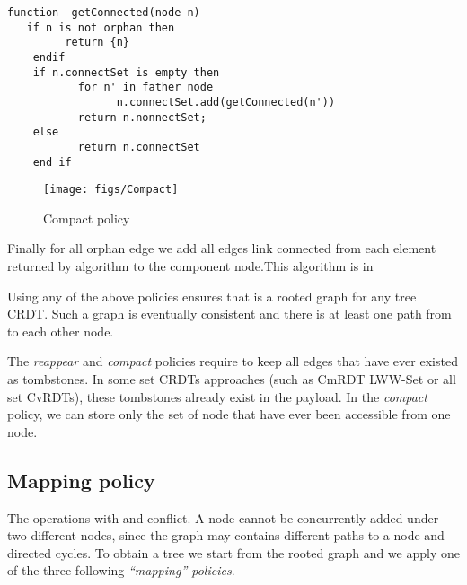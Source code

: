 \documentclass[a4paper]{article}
\begin{document}
\begin{description}
 \begin{lstlisting}
function  getConnected(node n)
   if n is not orphan then
         return {n}
    endif
    if n.connectSet is empty then
           for n' in father node
                 n.connectSet.add(getConnected(n'))
           return n.nonnectSet;
    else
           return n.connectSet
    end if
  \end{lstlisting}
 
 \begin{figure}
 \centering
 \texttt{[image: figs/Compact]}
 \caption{Compact policy}
\label{fig:Compact} 

 \end{figure}
 Finally for all orphan edge we add all edges link connected from each element returned by algorithm to the component node.This algorithm is in 
\end{description}

Using any of the above policies ensures that  is a rooted
graph for any tree CRDT. Such a graph is eventually consistent and
there is at least one path from  to each other node.

The {\em reappear} and {\em compact} policies require to keep all edges
that have ever existed as tombstones. In some set CRDTs approaches
(such as CmRDT LWW-Set or all set CvRDTs), these tombstones already
exist in the payload. In the {\em compact} policy, we can store only
the set of node that have ever been accessible from one node.



\subsection{Mapping policy}
\label{depolyhandrycyclotron}

The operations  with  and 
conflict. A node cannot be concurrently added under two different
nodes, since the graph may contains different paths to a node and
directed cycles. To obtain a tree we start from the rooted graph
 and we apply one of the three following {\em
  ``mapping'' policies}.
\end{document}
